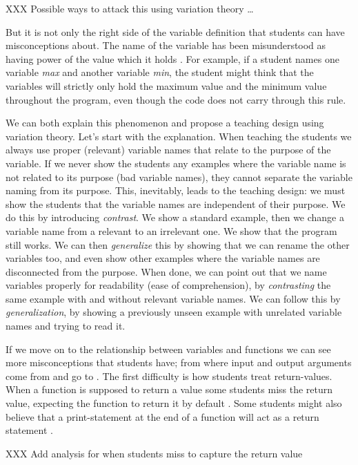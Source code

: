 XXX Possible ways to attack this using variation theory \dots

But it is not only the right side of the variable definition that students can 
have misconceptions about. The name of the variable has been misunderstood as 
having power of the value which it holds 
\parencite{MisconceptionsSurvey2017,Sleeman1984}. For example, if a student 
names one variable \emph{max} and another variable \emph{min}, the student 
might think that the variables will strictly only hold the maximum value and 
the minimum value throughout the program, even though the code does not carry 
through this rule. 

We can both explain this phenomenon and propose a teaching design using 
variation theory.
Let's start with the explanation.
When teaching the students we always use proper (\ie relevant) variable names 
that relate to the purpose of the variable.
If we never show the students any examples where the variable name is not 
related to its purpose (bad variable names), they cannot separate the variable 
naming from its purpose.
This, inevitably, leads to the teaching design:
we must show the students that the variable names are independent of their 
purpose.
We do this by introducing \emph{contrast}.
We show a standard example, then we change a variable name from a relevant to 
an irrelevant one.
We show that the program still works.
We can then \emph{generalize} this by showing that we can rename the other 
variables too, and even show other examples where the variable names are 
disconnected from the purpose.
When done, we can point out that we name variables properly for readability 
(ease of comprehension), by \emph{contrasting} the same example with and 
without relevant variable names.
We can follow this by \emph{generalization}, by showing a previously unseen 
example with unrelated variable names and trying to read it.

If we move on to the relationship between variables and functions we can see 
more misconceptions that students have; from where input and output arguments 
come from and go to \parencite{Ragonis2005OOP}.
The first difficulty is how students treat return-values. When a function is 
supposed to return a value some students miss the return value, expecting the 
function to return it by default \parencite{Kurvinen2016,KumarVeerasamy2016}. 
Some students might also believe that a print-statement at the end of a 
function will act as a return statement \parencite{MisconceptionsSurvey2017}. 

XXX Add analysis for when students miss to capture the return value


